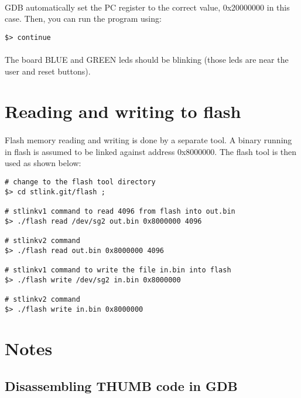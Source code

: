 \documentclass[a4paper, 11pt]{article}
\begin{document}
\paragraph{}
GDB automatically set the PC register to the correct value, 0x20000000 in this case. Then, you
can run the program using:\\
\begin{small}
\begin{lstlisting}[frame=tb]
$> continue
\end{lstlisting}
\end{small}

\paragraph{}
The board BLUE and GREEN leds should be blinking (those leds are near the user and reset buttons).


\newpage
\section{Reading and writing to flash}
\paragraph{}
Flash memory reading and writing is done by a separate tool. A binary running in flash is assumed to
be linked against address 0x8000000. The flash tool is then used as shown below:\\
\begin{small}
\begin{lstlisting}[frame=tb]
# change to the flash tool directory
$> cd stlink.git/flash ;

# stlinkv1 command to read 4096 from flash into out.bin
$> ./flash read /dev/sg2 out.bin 0x8000000 4096

# stlinkv2 command
$> ./flash read out.bin 0x8000000 4096

# stlinkv1 command to write the file in.bin into flash
$> ./flash write /dev/sg2 in.bin 0x8000000

# stlinkv2 command
$> ./flash write in.bin 0x8000000
\end{lstlisting}
\end{small}


\newpage
\section{Notes}

\subsection{Disassembling THUMB code in GDB}
\end{document}
